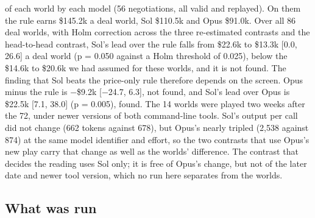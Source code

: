 of each world by each model (56 negotiations, all valid and replayed). On them the rule earns \$145.2k a deal world, Sol
\$110.5k and Opus \$91.0k. Over all 86 deal worlds, with Holm correction across the three re-estimated contrasts and the
head-to-head contrast, Sol's lead over the rule falls from \$22.6k to \$13.3k {[}0.0, 26.6{]} a deal world (p = 0.050 against
a Holm threshold of 0.025), below the \$14.6k to \$20.6k we had assumed for these worlds, and it is not found. The finding
that Sol beats the price-only rule therefore depends on the screen. Opus minus the rule is −\$9.2k {[}−24.7, 6.3{]}, not
found, and Sol's lead over Opus is \$22.5k {[}7.1, 38.0{]} (p = 0.005), found. The 14 worlds were played two weeks after
the 72, under newer versions of both command-line tools. Sol's output per call did not change (662 tokens against 678),
but Opus's nearly tripled (2,538 against 874) at the same model identifier and effort, so the two contrasts that use
Opus's new play carry that change as well as the worlds' difference. The contrast that decides the reading uses Sol
only; it is free of Opus's change, but not of the later date and newer tool version, which no run here separates from
the worlds.

\subsection{What was run}\label{what-was-run}

